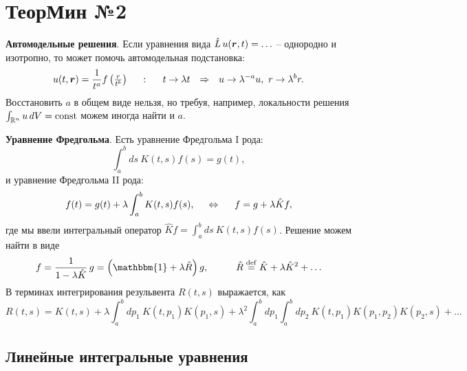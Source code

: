 \section*{ТеорМин №2}


\textbf{Автомодельные решения}. 
Если уравнения вида $\hat{L}\, u(\mbox{\boldmath $r$}, t) = \ldots$ -- однородно и изотропно, то может помочь автомодельная подстановка:
\begin{equation}
	u(t, \mbox{\boldmath $r$}) = \frac{1}{t^a} f\left(\tfrac{r}{t^b}\right)
	\hspace{5 mm} \colon \hspace{5 mm} 
	t \to \lambda t
	\hspace{0.25cm} \Rightarrow \hspace{0.25cm}
	u \to \lambda^{-a} u, \ r \to \lambda^{b} r.
	\label{am}
\end{equation}
Восстановить $a$ в общем виде нельзя, но требуя, например, локальности решения $\int_{\mathbb{R}^n} u \, d V = \textnormal{const}$ можем иногда найти и $a$. 


\textbf{Уравнение Фредгольма}. Есть уравнение Фредгольма I рода:
\begin{equation*}
	\int_{a}^{b} ds\ K(t, s) f(s) = g(t),
\end{equation*}
и уравнение Фредгольма II рода:
\begin{equation}
	f(t) = g(t) + \lambda \int_{a}^{b} K(t, s) f(s),
	\hspace{5 mm} \Leftrightarrow \hspace{5 mm} 
	f = g + \lambda \hat{K} f,
	\label{Feq2}
\end{equation}
где мы ввели интегральный оператор $\hat{K} f = \int_{a}^{b} ds \ K(t, s) f(s)$. Решение можем найти в виде
\begin{equation*}
	f = \frac{1}{1-\lambda \hat{K}}\,  g = \left(\mathbbm{1} + \lambda \hat{R}\right) g,
	\hspace{10 mm} 
	\hat{R} \overset{\mathrm{def}}{=}  \hat{K} + \lambda \hat{K}^2 + \ldots
\end{equation*}
В терминах интегрирования резульвента $R (t, s)$ выражается, как
\begin{equation}
	R(t,s) = K(t, s) + \lambda \int_{a}^{b}d p_1\  K(t, p_1) K(p_1, s) + 
	\lambda^2 \int_{a}^{b} d p_1 \int_{a}^{b} d p_2 \ K(t, p_1) K(p_1, p_2) K(p_2, s) + \ldots
	\label{FeqRI}
\end{equation}

\subsection*{Линейные интегральные уравнения}


